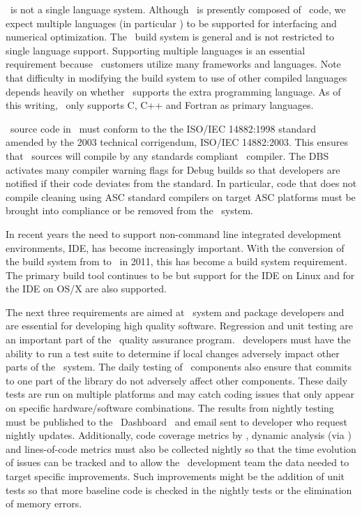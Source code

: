\draco\ is not a single language system.  Although \draco\ is
presently composed of \cpp\ code, we expect multiple languages
(in particular  ) to be supported for interfacing and numerical
optimization.  The \draco\ build system is general and is not
restricted to single language support.  Supporting multiple languages
is an essential requirement because \draco\ customers utilize many
frameworks and languages.  Note that difficulty in modifying the build system to use of other compiled languages depends heavily on whether \cmake\ supports the extra programming language.  As of this writing, \cmake\ only supports C, C++ and Fortran as primary languages.

\cpp\ source code in \draco\ must conform to the the ISO/IEC 14882:1998 standard amended by the 2003 technical corrigendum, ISO/IEC 14882:2003.  This ensures that \cpp\ sources will 
compile by any standards compliant \cpp\ compiler.  The DBS activates many compiler warning flags for Debug builds so that developers are notified if their code deviates from the standard.  In particular, code that does not compile cleaning using ASC standard compilers on target ASC platforms must be brought into compliance or be removed from the \draco\ system.

In recent years the need to support non-command line integrated development environments,  IDE, has become increasingly important.  With the conversion of the build system from  to \cmake\ in 2011, this has become a build system requirement.  The primary build tool continues to be  but support for the  IDE on Linux and for the  IDE on OS/X are also supported.

The next three requirements are aimed at \draco\ system and package
developers and are essential for developing high quality software.
Regression and unit testing are an important part of the \draco\ quality assurance program.  \draco\ developers must have the ability to run a test suite to determine if local changes adversely impact other parts of the \draco\ system.  The daily
testing of \draco\ components also ensure that commits to
one part of the library do not adversely affect other components.  These daily tests are run on multiple platforms and may catch coding issues that only appear on specific hardware/software combinations.  The results from nightly testing must be published to the \draco\ Dashboard~\cite{codercdash}  and email sent to developer who request nightly updates.  Additionally, code coverage metrics by \bullseye {}, dynamic analysis (via \valgrind)  and lines-of-code metrics  must also be collected nightly so that the time evolution of issues can be tracked and to allow the \draco\ development team the data needed to target specific improvements.  Such improvements might be the addition of unit tests so that more baseline code is checked in the nightly tests or the elimination of memory errors.

